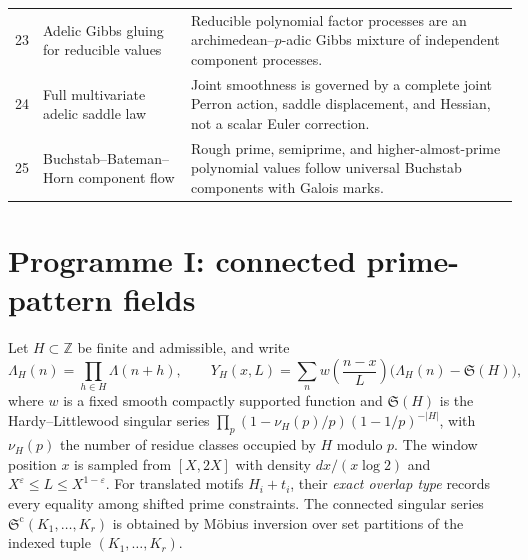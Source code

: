 \documentclass[11pt]{article}
\newcommand{\Z}{\mathbb Z}
\newcommand{\SG}{\mathfrak S}
\newcommand{\eps}{\varepsilon}
\begin{document}
\begin{longtable}{@{}p{}p{}p{}@{}}
23 & Adelic Gibbs gluing for reducible values & Reducible polynomial factor processes are an archimedean--$p$-adic Gibbs mixture of independent component processes.\\
24 & Full multivariate adelic saddle law & Joint smoothness is governed by a complete joint Perron action, saddle displacement, and Hessian, not a scalar Euler correction.\\
25 & Buchstab--Bateman--Horn component flow & Rough prime, semiprime, and higher-almost-prime polynomial values follow universal Buchstab components with Galois marks.\\
\bottomrule
\end{longtable}

\section{Programme I: connected prime-pattern fields}

Let $H\subset\Z$ be finite and admissible, and write
\[
 \Lambda_H(n)=\prod_{h\in H}\Lambda(n+h),\qquad
 Y_H(x,L)=\sum_n w\!\left(\frac{n-x}{L}\right)
 \bigl(\Lambda_H(n)-\SG(H)\bigr),
\]
where $w$ is a fixed smooth compactly supported function and $\SG(H)$ is the
Hardy--Littlewood singular series
$\prod_p(1-\nu_H(p)/p)(1-1/p)^{-|H|}$, with $\nu_H(p)$ the number of residue
classes occupied by $H$ modulo $p$.  The window position $x$ is
sampled from $[X,2X]$ with density $dx/(x\log2)$ and
$X^\eps\le L\le X^{1-\eps}$.  For translated motifs $H_i+t_i$, their \emph{exact
overlap type} records every equality among shifted prime constraints.  The connected
singular series $\SG^{\mathrm c}(K_1,\ldots,K_r)$ is obtained by M\"obius inversion over
set partitions of the indexed tuple $(K_1,\ldots,K_r)$.
\end{document}
